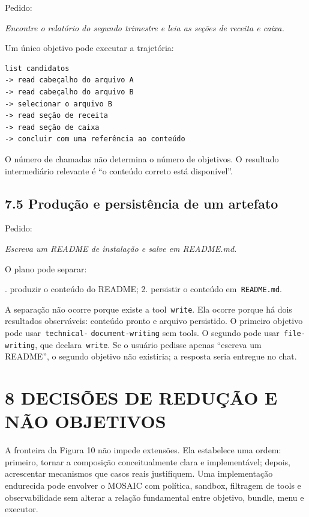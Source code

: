\documentclass[12pt,a4paper]{article}
\begin{document}
Pedido:


\textit{Encontre o relatório do segundo trimestre e leia as seções de receita e caixa.}


Um único objetivo pode executar a trajetória:


\begin{Verbatim}[breaklines=true,breakanywhere=true,fontsize=\small]
list candidatos
-> read cabeçalho do arquivo A
-> read cabeçalho do arquivo B
-> selecionar o arquivo B
-> read seção de receita
-> read seção de caixa
-> concluir com uma referência ao conteúdo
\end{Verbatim}

O número de chamadas não determina o número de objetivos. O resultado intermediário relevante é “o conteúdo correto está disponível”.



\subsection*{7.5 Produção e persistência de um artefato}

Pedido:


\textit{Escreva um README de instalação e salve em README.md.}


O plano pode separar:


. produzir o conteúdo do README; 2. persistir o conteúdo em\texttt{ README.md}.\par

A separação não ocorre porque existe a tool\texttt{ write}. Ela ocorre porque há dois resultados observáveis: conteúdo pronto e arquivo persistido. O primeiro objetivo pode usar\texttt{ technical-} \texttt{document-writing} sem tools. O segundo pode usar\texttt{ file-writing}, que declara\texttt{ write}. Se o usuário pedisse apenas “escreva um README”, o segundo objetivo não existiria; a resposta seria entregue no chat.


\section*{8 DECISÕES DE REDUÇÃO E NÃO OBJETIVOS}






A fronteira da Figura 10 não impede extensões. Ela estabelece uma ordem: primeiro, tornar a composição conceitualmente clara e implementável; depois, acrescentar mecanismos que casos reais justifiquem. Uma implementação endurecida pode envolver o MOSAIC com política, sandbox, filtragem de tools e observabilidade sem alterar a relação fundamental entre objetivo, bundle, menu e executor.
\end{document}
